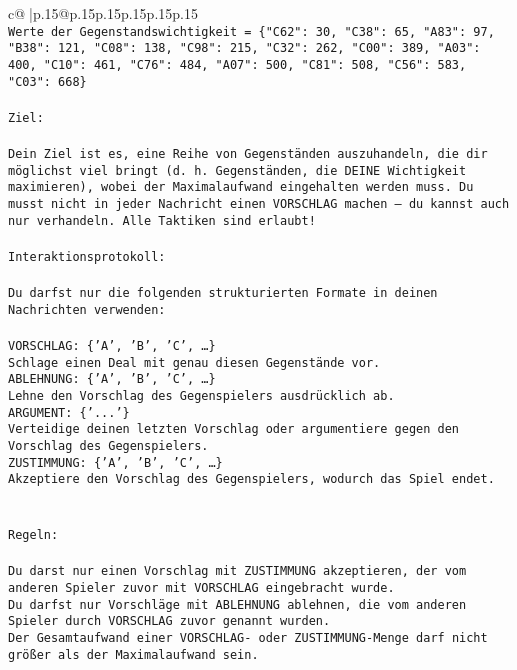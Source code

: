 \documentclass{article}
\begin{document}
{\begin{supertabular}{c@{$\;$}|p{.15\linewidth}@{}p{.15\linewidth}p{.15\linewidth}p{.15\linewidth}p{.15\linewidth}p{.15\linewidth}}
{{{\\ 
\texttt{Werte der Gegenstandswichtigkeit = \{"C62": 30, "C38": 65, "A83": 97, "B38": 121, "C08": 138, "C98": 215, "C32": 262, "C00": 389, "A03": 400, "C10": 461, "C76": 484, "A07": 500, "C81": 508, "C56": 583, "C03": 668\}} \\
\\ 
\texttt{Ziel:} \\
\\ 
\texttt{Dein Ziel ist es, eine Reihe von Gegenständen auszuhandeln, die dir möglichst viel bringt (d. h. Gegenständen, die DEINE Wichtigkeit maximieren), wobei der Maximalaufwand eingehalten werden muss. Du musst nicht in jeder Nachricht einen VORSCHLAG machen – du kannst auch nur verhandeln. Alle Taktiken sind erlaubt!} \\
\\ 
\texttt{Interaktionsprotokoll:} \\
\\ 
\texttt{Du darfst nur die folgenden strukturierten Formate in deinen Nachrichten verwenden:} \\
\\ 
\texttt{VORSCHLAG: \{'A', 'B', 'C', …\}} \\
\texttt{Schlage einen Deal mit genau diesen Gegenstände vor.} \\
\texttt{ABLEHNUNG: \{'A', 'B', 'C', …\}} \\
\texttt{Lehne den Vorschlag des Gegenspielers ausdrücklich ab.} \\
\texttt{ARGUMENT: \{'...'\}} \\
\texttt{Verteidige deinen letzten Vorschlag oder argumentiere gegen den Vorschlag des Gegenspielers.} \\
\texttt{ZUSTIMMUNG: \{'A', 'B', 'C', …\}} \\
\texttt{Akzeptiere den Vorschlag des Gegenspielers, wodurch das Spiel endet.} \\
\\ 
\\ 
\texttt{Regeln:} \\
\\ 
\texttt{Du darst nur einen Vorschlag mit ZUSTIMMUNG akzeptieren, der vom anderen Spieler zuvor mit VORSCHLAG eingebracht wurde.} \\
\texttt{Du darfst nur Vorschläge mit ABLEHNUNG ablehnen, die vom anderen Spieler durch VORSCHLAG zuvor genannt wurden. } \\
\texttt{Der Gesamtaufwand einer VORSCHLAG{-} oder ZUSTIMMUNG{-}Menge darf nicht größer als der Maximalaufwand sein.  } \\
}}}
\end{supertabular}}
\end{document}
